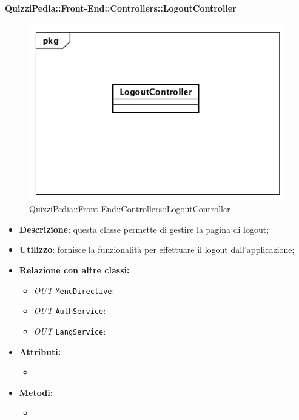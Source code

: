 \paragraph{QuizziPedia::Front-End::Controllers::LogoutController}
\begin{figure}
	\centering
	\includegraphics[scale=0.45]{UML/Classi/Front-End/QuizziPedia_Front-end_Controller_LogoutController.png}
	\caption{QuizziPedia::Front-End::Controllers::LogoutController}
\end{figure}
\begin{itemize}
	\item \textbf{Descrizione}: questa classe permette di gestire la pagina di logout;
	\item \textbf{Utilizzo}: fornisce la funzionalità per effettuare il logout dall'applicazione;
	\item \textbf{Relazione con altre classi:}
	\begin{itemize}
		\item \textit{OUT} \texttt{MenuDirective}:
		\item \textit{OUT} \texttt{AuthService}: 
		\item \textit{OUT} \texttt{LangService}:
	\end{itemize}
	\item \textbf{Attributi:}
	\begin{itemize}
		\item 
	\end{itemize}
	\item \textbf{Metodi:}
	\begin{itemize}
		\item 
	\end{itemize}
\end{itemize}

